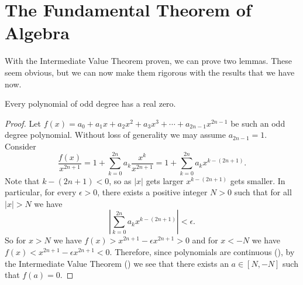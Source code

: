 \section{The Fundamental Theorem of Algebra}
With the Intermediate Value Theorem proven, we can prove two lemmas. These seem obvious, but we can now make them rigorous with the results that we have now.

\begin{lemma}\label{lemma-odd-degree-polynomial-has-real-zero}
    Every polynomial of odd degree has a real zero.
\end{lemma}
\begin{proof}
    Let $f(x) = a_0 + a_1x + a_2x^2 + a_3x^3 + \cdots + a_{2n-1}x^{2n-1}$ be such an odd degree polynomial. Without loss of generality we may assume $a_{2n-1} = 1$. Consider
    \[
        \frac{f(x)}{x^{2n+1}} = 1 + \sum_{k=0}^{2n}a_k\frac{x^k}{x^{2n+1}} = 1 + \sum_{k=0}^{2n}a_kx^{k-(2n+1)}.
    \]
    Note that $k - (2n+1) < 0$, so as $|x|$ gets larger $x^{k-(2n+1)}$ gets smaller. In particular, for every $\epsilon > 0$, there exists a positive integer $N > 0$ such that for all $|x| > N$ we have
    \[
        \left|\sum_{k=0}^{2n}a_kx^{k-(2n+1)}\right| < \epsilon.
    \]
    So for $x > N$ we have $f(x) > x^{2n+1} - \epsilon x^{2n+1} > 0$ and for $x < -N$ we have $f(x) < x^{2n+1} - \epsilon x^{2n+1} < 0$. Therefore, since polynomials are continuous (), by the Intermediate Value Theorem () we see that there exists an $a \in [N, -N]$ such that $f(a) = 0$.
\end{proof}

